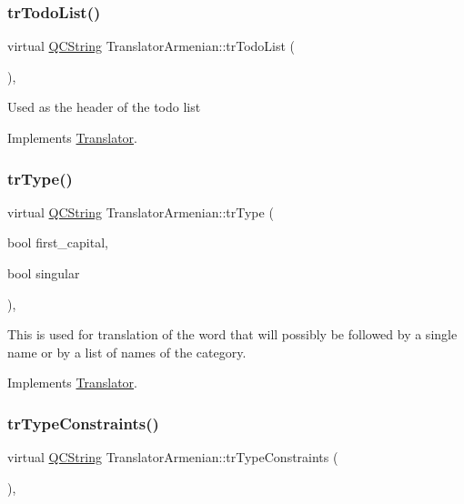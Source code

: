 \subsubsection{\texorpdfstring{trTodoList()}{trTodoList()}}
{\footnotesize\ttfamily virtual \mbox{\hyperlink{class_q_c_string}{Q\+C\+String}} Translator\+Armenian\+::tr\+Todo\+List (\begin{DoxyParamCaption}{ }\end{DoxyParamCaption})\hspace{0.3cm}{\ttfamily [inline]}, {\ttfamily [virtual]}}

Used as the header of the todo list 

Implements \mbox{\hyperlink{class_translator}{Translator}}.

\mbox{\label{class_translator_armenian_a37ecf3d37799fe21363933a81c13e1ca}} 
\subsubsection{\texorpdfstring{trType()}{trType()}}
{\footnotesize\ttfamily virtual \mbox{\hyperlink{class_q_c_string}{Q\+C\+String}} Translator\+Armenian\+::tr\+Type (\begin{DoxyParamCaption}\item[{bool}]{first\+\_\+capital,  }\item[{bool}]{singular }\end{DoxyParamCaption})\hspace{0.3cm}{\ttfamily [inline]}, {\ttfamily [virtual]}}

This is used for translation of the word that will possibly be followed by a single name or by a list of names of the category. 

Implements \mbox{\hyperlink{class_translator}{Translator}}.

\mbox{\label{class_translator_armenian_ad7ce8b22d4b480d13494f6e5b3898349}} 
\subsubsection{\texorpdfstring{trTypeConstraints()}{trTypeConstraints()}}
{\footnotesize\ttfamily virtual \mbox{\hyperlink{class_q_c_string}{Q\+C\+String}} Translator\+Armenian\+::tr\+Type\+Constraints (\begin{DoxyParamCaption}{ }\end{DoxyParamCaption})\hspace{0.3cm}{\ttfamily [inline]}, {\ttfamily [virtual]}}

